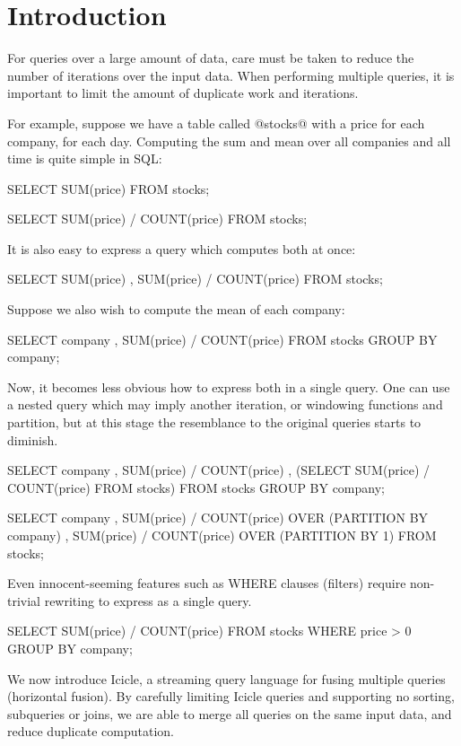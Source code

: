 \section{Introduction}
\label{s:Introduction}

For queries over a large amount of data, care must be taken to reduce the number of iterations over the input data.
When performing multiple queries, it is important to limit the amount of duplicate work and iterations.

For example, suppose we have a table called @stocks@ with a price for each company, for each day.
Computing the sum and mean over all companies and all time is quite simple in SQL:
\begin{code}
SELECT SUM(price)
FROM stocks;

SELECT SUM(price) / COUNT(price)
FROM stocks;
\end{code}

It is also easy to express a query which computes both at once:
\begin{code}
SELECT SUM(price)
     , SUM(price) / COUNT(price)
FROM stocks;
\end{code}

Suppose we also wish to compute the mean of each company:
\begin{code}
SELECT company
     , SUM(price) / COUNT(price)
FROM stocks
GROUP BY company;
\end{code}

Now, it becomes less obvious how to express both in a single query.
One can use a nested query which may imply another iteration, or windowing functions and partition, but at this stage the resemblance to the original queries starts to diminish.
\begin{code}
SELECT company
     , SUM(price) / COUNT(price)
     , (SELECT SUM(price) / COUNT(price) FROM stocks)
FROM stocks
GROUP BY company;

SELECT company
     , SUM(price) / COUNT(price) OVER (PARTITION BY company)
     , SUM(price) / COUNT(price) OVER (PARTITION BY 1)
FROM stocks;
\end{code}

Even innocent-seeming features such as WHERE clauses (filters) require non-trivial rewriting to express as a single query.

\begin{code}
SELECT SUM(price) / COUNT(price)
FROM stocks
WHERE price > 0
GROUP BY company;
\end{code}


We now introduce Icicle, a streaming query language for fusing multiple queries (horizontal fusion).
By carefully limiting Icicle queries and supporting no sorting, subqueries or joins, we are able to merge all queries on the same input data, and reduce duplicate computation.


